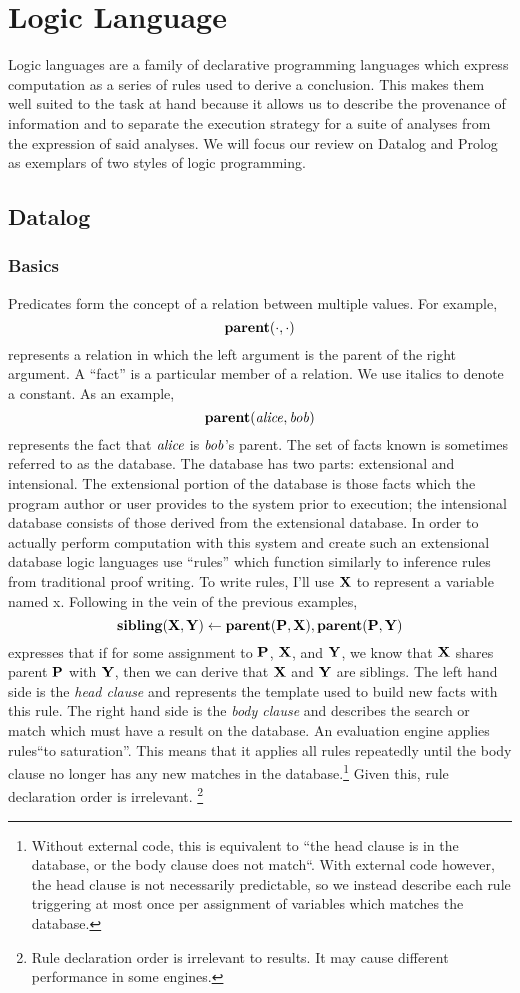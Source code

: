 \section{Logic Language}
Logic languages are a family of declarative programming languages which express computation as a series of rules used to derive a conclusion.
This makes them well suited to the task at hand because it allows us to describe the provenance of information and to separate the execution strategy for a suite of analyses from the expression of said analyses.
We will focus our review on Datalog and Prolog as exemplars of two styles of logic programming.
\subsection{Datalog}
\label{sec:fchain}
\subsubsection{Basics}
Predicates form the concept of a relation between multiple values.
For example,
\[
        {\bf parent}(\cdot, \cdot)
\]
represents a relation in which the left argument is the parent of the right argument.
A ``fact'' is a particular member of a relation.
We use italics to denote a constant.
As an example,
\[
        {\bf parent}({\it alice}, {\it bob})
\]
represents the fact that ${\it alice}$ is ${\it bob}$'s parent.
The set of facts known is sometimes referred to as the database.
The database has two parts: extensional and intensional.
The extensional portion of the database is those facts which the program author or user provides to the system prior to execution; the intensional database consists of those derived from the extensional database.
In order to actually perform computation with this system and create such an extensional database logic languages use ``rules'' which function similarly to inference rules from traditional proof writing.
To write rules, I'll use ${\bf X}$ to represent a variable named x.
Following in the vein of the previous examples,
\[
        {\bf sibling}({\bf X}, {\bf Y}) \leftarrow {\bf parent}({\bf P}, {\bf X}), {\bf parent}({\bf P}, {\bf Y})
\]
expresses that if for some assignment to ${\bf P}$, ${\bf X}$, and ${\bf Y}$, we know that ${\bf X}$ shares parent ${\bf P}$ with ${\bf Y}$, then we can derive that ${\bf X}$ and ${\bf Y}$ are siblings.
The left hand side is the \emph{head clause} and represents the template used to build new facts with this rule.
The right hand side is the \emph{body clause} and describes the search or match which must have a result on the database.
An evaluation engine applies rules``to saturation''.
This means that it applies all rules repeatedly until the body clause no longer has any new matches in the database.\footnote {
Without external code, this is equivalent to ``the head clause is in the database, or the body clause does not match``. With external code however, the head clause is not necessarily predictable, so we instead describe each rule triggering at most once per assignment of variables which matches the database.
}
Given this, rule declaration order is irrelevant.
\footnote{
  Rule declaration order is irrelevant to results.
  It may cause different performance in some engines.
}
